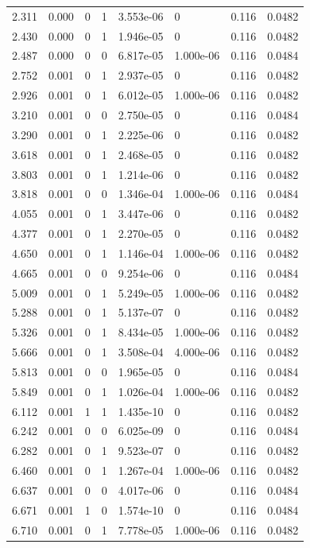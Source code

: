 \documentclass[preview]{standalone}
\begin{document}
{{\begin{tabular}{L{1.2cm}C{1.2cm} C{0.3cm}C{0.5cm} C{1.4cm}C{1.4cm} C{1.4cm}C{1.4cm}}
  2.311  &  0.000  & 0     &  1 &  3.553e-06  & 0  & 0.116 &  0.0482   \\ 
  2.430  &  0.000  & 0     &  1 &  1.946e-05  & 0  & 0.116 &  0.0482   \\ 
  2.487  &  0.000  & 0     &  0 &  6.817e-05  & 1.000e-06  & 0.116 &  0.0484   \\ 
  2.752  &  0.001  & 0     &  1 &  2.937e-05  & 0  & 0.116 &  0.0482   \\ 
  2.926  &  0.001  & 0     &  1 &  6.012e-05  & 1.000e-06  & 0.116 &  0.0482   \\ 
  3.210  &  0.001  & 0     &  0 &  2.750e-05  & 0  & 0.116 &  0.0484   \\ 
  3.290  &  0.001  & 0     &  1 &  2.225e-06  & 0  & 0.116 &  0.0482   \\ 
  3.618  &  0.001  & 0     &  1 &  2.468e-05  & 0  & 0.116 &  0.0482   \\ 
  3.803  &  0.001  & 0     &  1 &  1.214e-06  & 0  & 0.116 &  0.0482   \\ 
  3.818  &  0.001  & 0     &  0 &  1.346e-04  & 1.000e-06  & 0.116 &  0.0484   \\ 
  4.055  &  0.001  & 0     &  1 &  3.447e-06  & 0  & 0.116 &  0.0482   \\ 
  4.377  &  0.001  & 0     &  1 &  2.270e-05  & 0  & 0.116 &  0.0482   \\ 
  4.650  &  0.001  & 0     &  1 &  1.146e-04  & 1.000e-06  & 0.116 &  0.0482   \\ 
  4.665  &  0.001  & 0     &  0 &  9.254e-06  & 0  & 0.116 &  0.0484   \\ 
  5.009  &  0.001  & 0     &  1 &  5.249e-05  & 1.000e-06  & 0.116 &  0.0482   \\ 
  5.288  &  0.001  & 0     &  1 &  5.137e-07  & 0  & 0.116 &  0.0482   \\ 
  5.326  &  0.001  & 0     &  1 &  8.434e-05  & 1.000e-06  & 0.116 &  0.0482   \\ 
  5.666  &  0.001  & 0     &  1 &  3.508e-04  & 4.000e-06  & 0.116 &  0.0482   \\ 
  5.813  &  0.001  & 0     &  0 &  1.965e-05  & 0  & 0.116 &  0.0484   \\ 
  5.849  &  0.001  & 0     &  1 &  1.026e-04  & 1.000e-06  & 0.116 &  0.0482   \\ 
  6.112  &  0.001  & 1     &  1 &  1.435e-10  & 0  & 0.116 &  0.0482   \\ 
  6.242  &  0.001  & 0     &  0 &  6.025e-09  & 0  & 0.116 &  0.0484   \\ 
  6.282  &  0.001  & 0     &  1 &  9.523e-07  & 0  & 0.116 &  0.0482   \\ 
  6.460  &  0.001  & 0     &  1 &  1.267e-04  & 1.000e-06  & 0.116 &  0.0482   \\ 
  6.637  &  0.001  & 0     &  0 &  4.017e-06  & 0  & 0.116 &  0.0484   \\ 
  6.671  &  0.001  & 1     &  0 &  1.574e-10  & 0  & 0.116 &  0.0484   \\ 
  6.710  &  0.001  & 0     &  1 &  7.778e-05  & 1.000e-06  & 0.116 &  0.0482   \\ 
\hline 
\end{tabular} 

}}
\end{document}
